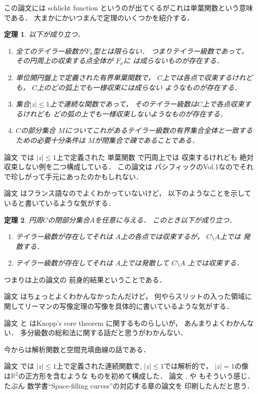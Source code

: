 \documentclass[leqno, a4paper, 12pt]{jsarticle}
\newtheorem{thm}{定理}
\newcommand{\rr}{\mathbb{R}}
\begin{document}
この論文には
schlicht function というのが出てくるがこれは単葉関数という意味である．
大まかにかいつまんで定理のいくつかを紹介する．
\begin{thm}
以下が成り立つ．
\begin{enumerate}
\item 
全てのテイラー級数が$F_{\sigma}$型とは限らない．
つまりテイラー級数であって，その円周上の収束する点全体が
$F_{\sigma}$に
は成らないものが存在する．
\item 
単位開円盤上で定義された有界単葉関数で，
$C$上では各点で収束するけれども，
$C$上のどの弧上でも一様収束には成らない
ようなものが存在する．

\item 
集合$|z|\le 1$上で連続な関数であって，
そのテイラー級数は$C$上で各点収束するけれども
どの弧の上でも一様収束しないようなものが存在する．

\item 
$C$の部分集合
$M$についてこれがあるテイラー級数の有界集合全体と一致するための必要十分条件は
$M$が閉集合で疎であることである．
\end{enumerate}
\end{thm}


論文
\cite{MR0043889}
では
$|z|\le 1$上で定義された
単葉関数
で円周上では
収束するけれども
絶対収束しない例を二つ構成している．
この論文は
パシフィックのVol.1なのでそれで珍しがって手元にあったのかもしれない．


論文
\cite{Mazurkiewicz1922}
はフランス語なのでよくわかっていないけど，
以下のようなことを示していると書いているような気がする．
\begin{thm}
円周$C$の閉部分集合$A$を任意に与える．
このとき以下が成り立つ．
\begin{enumerate}[label=\textup{(\arabic*)}]
\item 
テイラー級数が存在してそれは
$A$上の各点では収束するが，
$C\setminus A$上では
発散する．
\item 
テイラー級数が存在してそれは
$A$上では発散して
$C\setminus A$
上では収束する．

\end{enumerate}
\end{thm}
つまりは上の論文の
前身的結果ということである．


論文\cite{MR0050680}
はちょっとよくわかんなかったんだけど，
何やらスリットの入った領域に関してリーマンの写像定理の写像を具体的に書いているような気がする．


論文
\cite{MR0942366}と
\cite{MR0549529}
はKnopp's core theorem 
に関するものらしいが，
あんまりよくわかんない．
多分級数の総和法に関する話だと思うがわかんない．

今からは解析関数と空間充填曲線の話である．

論文
\cite{MR0015154}
では
$|z|\le 1$上で定義された連続関数で,
$|z|\le 1$では解析的で，
$|z|=1$の像は$\rr^{2}$の正方形を含むような
ものを初めて構成した．
論文
\cite{MR0062219}, 
\cite{MR0050016}
や
\cite{MR0133439}
もそういう感じ．
たぶん
数学書``Space-filling curves''の対応する章の論文を
印刷したんだと思う．

\nocite{*}


\end{document}
